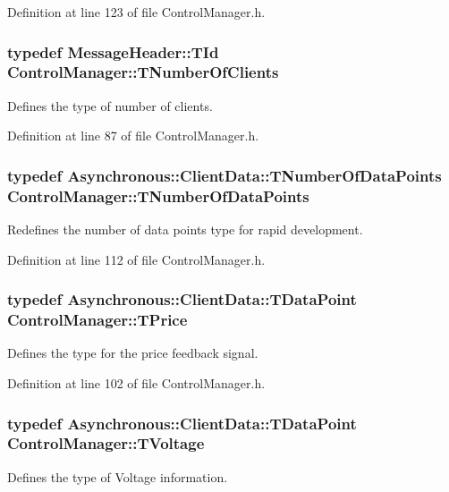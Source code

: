 Definition at line 123 of file Control\-Manager.\-h.

\hypertarget{class_control_manager_a7eefb0a4e9d10e65771939912d650bcc}{
\subsubsection[{T\-Number\-Of\-Clients}]{\setlength{\rightskip}{0pt plus 5cm}typedef {\bf Message\-Header\-::\-T\-Id} {\bf Control\-Manager\-::\-T\-Number\-Of\-Clients}}}\label{class_control_manager_a7eefb0a4e9d10e65771939912d650bcc}
Defines the type of number of clients. 

Definition at line 87 of file Control\-Manager.\-h.

\hypertarget{class_control_manager_a90ca5d46699df9c6e67c96e36727eff1}{
\subsubsection[{T\-Number\-Of\-Data\-Points}]{\setlength{\rightskip}{0pt plus 5cm}typedef {\bf Asynchronous\-::\-Client\-Data\-::\-T\-Number\-Of\-Data\-Points} {\bf Control\-Manager\-::\-T\-Number\-Of\-Data\-Points}}}\label{class_control_manager_a90ca5d46699df9c6e67c96e36727eff1}
Redefines the number of data points type for rapid development. 

Definition at line 112 of file Control\-Manager.\-h.

\hypertarget{class_control_manager_acad2d80fd0659e3d979389de905e7b5b}{
\subsubsection[{T\-Price}]{\setlength{\rightskip}{0pt plus 5cm}typedef {\bf Asynchronous\-::\-Client\-Data\-::\-T\-Data\-Point} {\bf Control\-Manager\-::\-T\-Price}}}\label{class_control_manager_acad2d80fd0659e3d979389de905e7b5b}
Defines the type for the price feedback signal. 

Definition at line 102 of file Control\-Manager.\-h.

\hypertarget{class_control_manager_a336440023399b9165c117020f6b14ec3}{
\subsubsection[{T\-Voltage}]{\setlength{\rightskip}{0pt plus 5cm}typedef {\bf Asynchronous\-::\-Client\-Data\-::\-T\-Data\-Point} {\bf Control\-Manager\-::\-T\-Voltage}}}\label{class_control_manager_a336440023399b9165c117020f6b14ec3}
Defines the type of Voltage information. 

